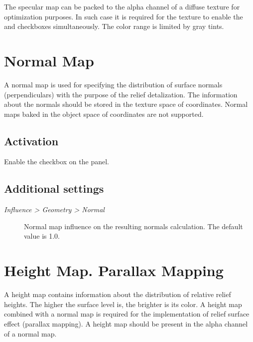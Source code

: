 \documentclass[a4paper,12pt,oneside]{sphinxmanual}
\begin{document}
The specular map can be packed to the alpha channel of a diffuse texture for optimization purposes. In such case it is required for the texture to enable the  and  checkboxes simultaneously. The color range is limited by gray tints.


\section{Normal Map}
\label{textures:index-6}\label{textures:normal-map}
A normal map is used for specifying the distribution of surface normals (perpendiculars) with the purpose of the relief detalization. The information about the normals should be stored in the texture space of coordinates. Normal maps baked in the object space of coordinates are not supported.


\subsection{Activation}
\label{textures:id8}
Enable the  checkbox on the  panel.


\subsection{Additional settings}
\label{textures:id9}\begin{description}
\item[{\emph{Influence \textgreater{} Geometry \textgreater{} Normal}}] \leavevmode
Normal map influence on the resulting normals calculation. The default value is 1.0.

\end{description}


\section{Height Map. Parallax Mapping}
\label{textures:index-7}\label{textures:height-map-parallax-mapping}
A height map contains information about the distribution of relative relief heights. The higher the surface level is, the brighter is its color. A height map combined with a normal map is required for the implementation of relief surface effect (parallax mapping). A height map should be present in the alpha channel of a normal map.
\end{document}
